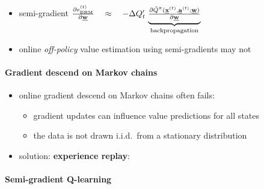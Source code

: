 	\vspace{2mm}
	\begin{itemize}
		\item semi-gradient \quad
				$	\frac{\partial e^{(t)}_\text{BRM}}{\partial\vec w} 
				 	\quad\approx\quad -\Delta Q'_t \, 
					\underbrace{\smallfrac{\partial 
						\tilde Q^\pi(\vec x^{(t)}, \vec a^{(t)}; \vec w)}
						{\partial \vec w}
					}_{\kern-10ex\text{backpropagation}\kern-10ex}$
		\vspace{4mm}
		\item online {\em off-policy} value estimation 
			using semi-gradients may not
	\end{itemize}

\paragraph{Gradient descend on Markov chains}
	\vspace{6mm}	
	\begin{itemize}
		\item online gradient descend on Markov chains often fails:
			\begin{itemize}
				\item gradient updates can influence value 
					predictions for all states
				\vspace{1mm}
				\item the data is not drawn i.i.d.~from 
					a stationary distribution %
			\end{itemize}
		\vspace{6mm}
		\item solution: {\bf experience replay}:
	\end{itemize}
	
\paragraph{Semi-gradient Q-learning}

